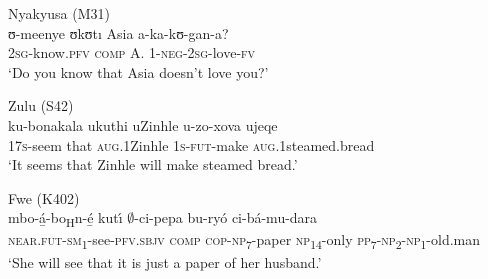 \documentclass[output=paper,colorlinks,citecolor=brown,
]{langscibook}
\begin{document}
\ea\label{ex:gluckman:say.ti}
	\begin{xlist}
	\ex Nyakyusa (M31)  \citep[314]{Persohn:2017} \\
	\gll ʊ-meenye ʊkʊt{\i} Asia a-ka-kʊ-gan-a?\\
	2\textsc{sg}-know.\textsc{pfv} \textsc{comp} A. 1-\textsc{neg}-2\textsc{sg}-love-\textsc{fv}\\
	\glt `Do you know that Asia doesn't love you?' 
	
	\ex Zulu (S42) \citep[1]{Halpert:2016} \\
	\gll ku-bonakala ukuthi uZinhle u-zo-xova ujeqe\\
	17\textsc{s}-seem that \textsc{aug}.1Zinhle 1\textsc{s}-\textsc{fut}-make \textsc{aug}.1steamed.bread\\
	\glt `It seems that Zinhle will make steamed bread.' 

	\ex Fwe (K402) \citep[432]{Gunnink:2018} \\	
	\gll mbo-{{á̱}}-bo\textsubscript{H}n-{{é̱}} kut{\'\i} $\emptyset$-ci-pepa bu-ry\'o ci-bá-mu-dara\\
	\textsc{near.fut}-\textsc{sm}\textsubscript{1}-see-\textsc{pfv.sbjv} \textsc{comp} \textsc{cop}-\textsc{np}\textsubscript{7}-paper \textsc{np}\textsubscript{14}-only \textsc{pp}\textsubscript{7}-\textsc{np}\textsubscript{2}-\textsc{np}\textsubscript{1}-old.man\\
	\glt `She will see that it is just a paper of her husband.' 
	
	\end{xlist}
\z

%
\end{document}
